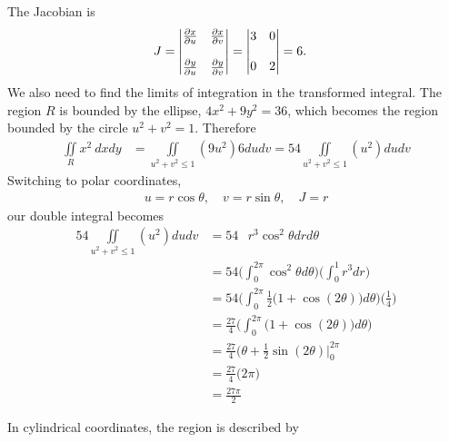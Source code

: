 \item %
The Jacobian is
\begin{align*}   J &=  
  \begin{vmatrix}
   \frac{\partial x}{\partial u} &  \frac{\partial x}{\partial v} \\ \\
   \frac{\partial y}{\partial u} & \frac{\partial y}{\partial v} \\
  \end{vmatrix}
  =     \begin{vmatrix}
   3 & 0 \\ \\
   0 & 2 \\
  \end{vmatrix}
  = 6 .
 \end{align*}
We also need to find the limits of integration in the transformed integral. The region $R$ is bounded by the ellipse, $4x^2 + 9y^2 = 36$, which becomes the region bounded by the circle $u^2 + v^2 = 1$. Therefore
\begin{align*}
  \iint\limits_R x^2 \ dxdy &= \iint\limits_{u^2 + v^2 \le 1} (9u^2) 6dudv =  54 \iint\limits_{u^2 + v^2 \le 1} (u^2) dudv
\end{align*}
Switching to polar coordinates, 
\begin{align*}
  u = r\cos\theta, \quad v = r\sin\theta, \quad J = r
\end{align*}
our double integral becomes
\begin{align*}
  54 \iint\limits_{u^2 + v^2 \le 1} (u^2) dudv 
  & = 54 \mathop{\int_0^{2\pi} \!\! \int_0^1} r^3\cos^2\theta drd\theta  \\
  & = 54 \Bigg( \int_0^{2\pi} \cos^2\theta d\theta \Bigg)\Bigg( \int_0^1 r^3 dr \Bigg) \\
  & = 54 \Bigg( \int_0^{2\pi} \frac{1}{2} \big(1+\cos(2\theta) \big) d\theta \Bigg) \Bigg( \frac{1}{4} \Bigg) \\
  & =\frac{27}{4} \Bigg( \int_0^{2\pi}  \big(1+\cos(2\theta) \big) d\theta \Bigg) \\
  & =\frac{27}{4} \big(\theta+\frac{1}{2}\sin(2\theta) \big|_0^{2\pi}  \\
  & =\frac{27}{4} \big(2\pi\big)  \\
  & =\frac{27\pi}{2} 
\end{align*}
\item %
In cylindrical coordinates, the region is described by 
